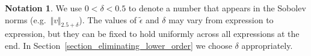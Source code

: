 \documentclass[10pt,reqno]{amsart}
\theoremstyle{plain}
\theoremstyle{definition}
\newtheorem{notation}[theorem]{Notation}
\numberwithin{equation}{section}
\newcommand{\ccP}{\mathscr{P}}
\newcommand{\de}{\delta}
\newcommand{\norm}[1]{\Vert#1\Vert}
\begin{document}
\begin{notation}
We use $0 < \de < 0.5$ to denote a number that appears in the Sobolev norms (e.g.~$\norm{v}_{2.5+\de}$). 
The values of $\widetilde{\epsilon}$ and
$\de$ may vary from expression to expression, 
but they can be fixed
to hold uniformly across all expressions at the end. 
In Section~\ref{section_eliminating_lower_order} 
we choose $\de$ appropriately.
\end{notation} 





\end{document}
